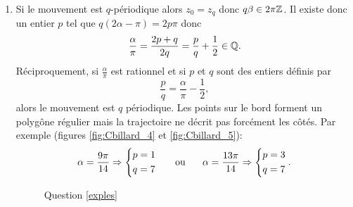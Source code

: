 \begin{enumerate}
\item Si le mouvement est $q$-périodique alors $z_0=z_q$ donc $q\beta\in 2 \pi\mathbb{Z}$. Il existe donc un entier $p$ tel que $q(2\alpha - \pi)=2p\pi$ donc
\begin{displaymath}
  \frac{\alpha}{\pi}=\frac{2p + q}{2q} = \frac{p}{q} + \frac{1}{2} \in \mathbb{Q} .
\end{displaymath}
Réciproquement, si $\frac{\alpha}{\pi}$ est rationnel et si $p$ et $q$ sont des entiers définis par
\begin{displaymath}
\frac{p}{q} = \frac{\alpha}{\pi} - \frac{1}{2}, 
\end{displaymath}
alors le mouvement est $q$ périodique. Les points sur le bord forment un polygône régulier mais la trajectoire ne décrit pas forcément les côtés.
Par exemple \label{exples} (figures \ref{fig:Cbillard_4} et \ref{fig:Cbillard_5}): 
\begin{displaymath}
  \alpha = \frac{9\pi}{14}\Rightarrow 
\left\lbrace  
\begin{aligned}
  &p=1 \\ &q = 7
\end{aligned}
\right. 
\hspace{0.5cm}\text{ ou }\hspace{0.5cm}
  \alpha = \frac{13\pi}{14}\Rightarrow 
\left\lbrace  
\begin{aligned}
  &p=3 \\ &q = 7
\end{aligned}
\right. .
\end{displaymath}
\begin{figure}[h]
  \centering
  \hspace{1cm}
  \caption{Question \ref{exples}}
\end{figure}


\end{enumerate}
